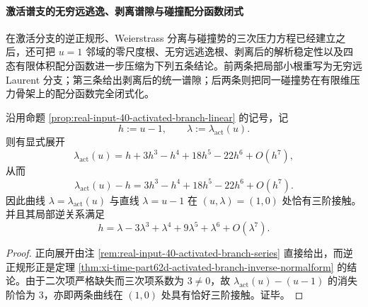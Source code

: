 \paragraph{激活谱支的无穷远逃逸、剥离谱隙与碰撞配分函数闭式}
在激活分支的逆正规形、Weierstrass 分离与碰撞势的三次压力方程已经建立之后，还可把 \(u=1\) 邻域的零尺度根、无穷远逃逸根、剥离后的解析稳定性以及四态有限体积配分函数进一步压缩为下列五条结论。前两条把局部小根重写为无穷远 Laurent 分支；第三条给出剥离后的统一谱隙；后两条则把同一碰撞势在有限维压力骨架上的配分函数完全闭式化。

\begin{conclusion}[激活分支与 \texorpdfstring{$\lambda=u-1$}{lambda=u-1} 的三阶接触及其逆正规形]\label{con:xi-time-part62dga-activated-third-order-contact-reversion}
沿用命题 \ref{prop:real-input-40-activated-branch-linear} 的记号，记
\[
h:=u-1,
\qquad
\lambda:=\lambda_{\mathrm{act}}(u).
\]
则有显式展开
\[
\lambda_{\mathrm{act}}(u)
=
h+3h^3-h^4+18h^5-22h^6+O(h^7),
\]
从而
\[
\lambda_{\mathrm{act}}(u)-h
=
3h^3-h^4+18h^5-22h^6+O(h^7).
\]
因此曲线 \(\lambda=\lambda_{\mathrm{act}}(u)\) 与直线 \(\lambda=u-1\) 在 \((u,\lambda)=(1,0)\) 处恰有三阶接触。并且其局部逆关系满足
\[
h
=
\lambda-3\lambda^3+\lambda^4+9\lambda^5+\lambda^6+O(\lambda^7).
\]
\end{conclusion}
\begin{proof}
正向展开由注 \ref{rem:real-input-40-activated-branch-series} 直接给出，而逆正规形正是定理 \ref{thm:xi-time-part62d-activated-branch-inverse-normalform} 的结论。由于二次项严格缺失而三次项系数为 \(3\neq 0\)，故 \(\lambda_{\mathrm{act}}(u)-(u-1)\) 的消失阶恰为 \(3\)，亦即两条曲线在 \((1,0)\) 处具有恰好三阶接触。证毕。
\end{proof}

